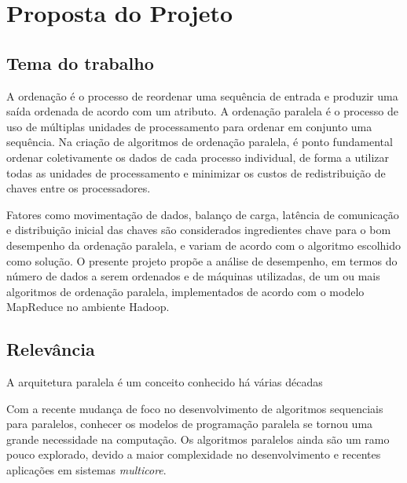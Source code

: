 \chapter{Proposta do Projeto}

\section{Tema do trabalho}


A ordenação é o processo de reordenar uma sequência de entrada e produzir uma saída ordenada de acordo com um atributo. 
A ordenação paralela é o processo de uso de múltiplas unidades de processamento para ordenar em conjunto uma sequência. Na criação de algoritmos de ordenação paralela, é ponto fundamental ordenar coletivamente os dados de cada processo individual, de forma a utilizar todas as unidades de processamento e minimizar os custos de redistribuição de chaves entre os processadores. \cite{Kale:2010} 


Fatores como movimentação de dados, balanço de carga, latência de comunicação e distribuição inicial das chaves são considerados ingredientes chave para o bom desempenho da ordenação paralela, e variam de acordo com o algoritmo escolhido como solução. O presente projeto propõe a análise de desempenho, em termos do número de dados a serem ordenados e de máquinas utilizadas, de um ou mais algoritmos de ordenação paralela, implementados de acordo com o modelo MapReduce no ambiente Hadoop.


\section{Relevância}

A arquitetura paralela é um conceito conhecido há várias décadas 

%


Com a recente mudança de foco no desenvolvimento de algoritmos sequenciais para paralelos, conhecer os modelos de programação paralela se tornou uma grande necessidade na computação. Os algoritmos paralelos ainda são um ramo pouco explorado, devido a  maior complexidade no desenvolvimento e recentes aplicações em sistemas \textit{multicore}.


